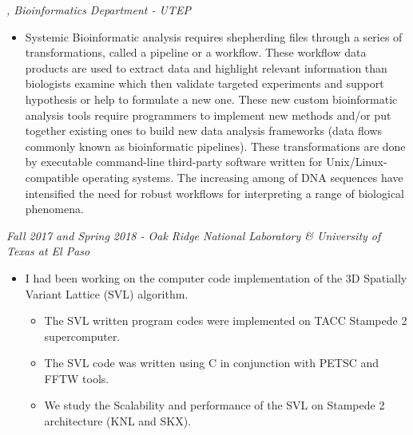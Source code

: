 \documentclass[margin]{res}
\begin{document}
\begin{resume}
{\sl , Bioinformatics Department - UTEP} %
\begin{itemize}\itemsep -2pt
\item Systemic Bioinformatic analysis requires shepherding files through a series of transformations, called a pipeline or a workflow.
These workflow data products are used to extract data and highlight relevant information than biologists examine which then validate targeted 
experiments and support hypothesis or help to formulate a new one. These new custom bioinformatic analysis tools require programmers to implement
new methods and/or put together existing ones to build new data analysis frameworks (data flows commonly known as bioinformatic pipelines).
These transformations are done by executable command-line third-party software written for Unix/Linux-compatible operating systems. The increasing among of DNA
sequences have intensified the need for robust workflows for interpreting a range of biological phenomena.
\end{itemize}


{\sl Fall 2017 and Spring 2018 - Oak Ridge National Laboratory \& University of Texas at El Paso} \hfill %
\begin{itemize}
\item I had been working on the computer code implementation of the 3D Spatially Variant Lattice (SVL) algorithm.
\begin{itemize}\itemsep -2pt
\item The SVL  written program codes were implemented on TACC Stampede 2 supercomputer.
\item The SVL code was written using C in conjunction with PETSC and FFTW tools.
\item We study the Scalability and performance of the SVL on Stampede 2 architecture (KNL and SKX).
\end{itemize}
\end{itemize}


\end{resume}
\end{document}
